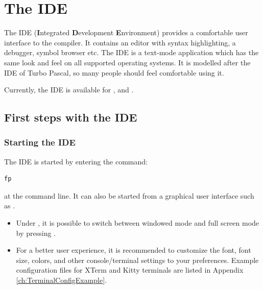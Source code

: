 %
%
%
%
%
\chapter{The IDE}

The IDE (\textbf{I}ntegrated \textbf{D}evelopment \textbf{E}nvironment)
provides a comfortable user interface to the compiler. It contains an
editor with syntax highlighting, a debugger, symbol browser etc.
The IDE is a text-mode application which has the same look and feel
on all supported operating systems. It is modelled after the IDE of Turbo
Pascal, so many people should feel comfortable using it.

Currently, the IDE is available for \dos, \windows and \linux.

\section{First steps with the IDE}
%
%
\subsection{Starting the IDE}
The IDE is started by entering the command:
\begin{verbatim}
fp
\end{verbatim}
at the command line. It can also be started from a graphical user
interface such as \windows.
\begin{remark}
\begin{itemize}
\item Under \windows, it is possible to switch between windowed mode and
full screen mode by pressing .
\item For a better user experience, it is recommended to customize the font,
font size, colors, and other console/terminal settings to your preferences.
Example configuration files for XTerm and Kitty terminals are listed in
Appendix {\ref{ch:TerminalConfigExample}}.
\end{itemize}
\end{remark}
%
%

